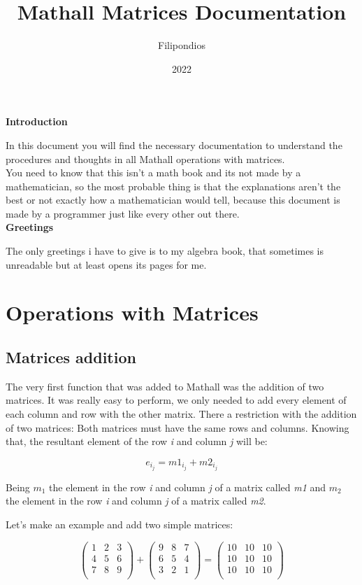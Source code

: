 \documentclass{article}
\title{\textbf{Mathall Matrices Documentation}}
\author{Filipondios}
\date{2022}
\begin{document}
\maketitle
\newpage

\textbf{Introduction}

In this document you will find the necessary documentation to understand the procedures and
thoughts in all Mathall operations with matrices.\\

You need to know that this isn't a math book and its not made by a mathematician, so the most
probable thing is that the explanations aren't the best or not exactly how a mathematician would
tell, because this document is made by a programmer just like every other out there.\\

\textbf{Greetings}

The only greetings i have to give is to my algebra book, that sometimes is unreadable but at least
opens its pages for me.

\newpage 

\section{Operations with Matrices}
\subsection{Matrices addition}

The very first function that was added to Mathall was the addition of two matrices. It was really
easy to perform, we only needed to add every element of each column and row with the other matrix.
There a restriction with the addition of two matrices: Both matrices must have the same
rows and columns. Knowing that, the resultant element of the row \textit{i} and column \textit{j} will be:

\[ e_{i_j} = m1_{i_j} + m2_{i_j} \]

Being $m_1$ the element in the row \textit{i} and column \textit{j} of a matrix called \textit{m1}
and $m_2$ the element in the row \textit{i} and column \textit{j} of a matrix called \textit{m2}.


Let's make an example and add two simple matrices:

\[
\begin{pmatrix}
    1 & 2 & 3 \\
    4 & 5 & 6 \\
    7 & 8 & 9 \\
\end{pmatrix}
  + 
\begin{pmatrix}
    9 & 8 & 7 \\
    6 & 5 & 4 \\
    3 & 2 & 1 \\
\end{pmatrix}
=
\begin{pmatrix}
    10 & 10 & 10 \\
    10 & 10 & 10 \\
    10 & 10 & 10 \\
\end{pmatrix}
\]
\end{document}
